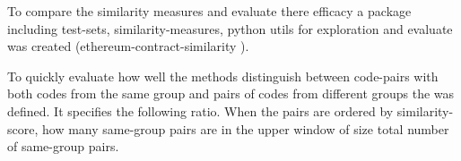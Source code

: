 \documentclass[../main.tex]{subfiles}
\begin{document}
To compare the similarity measures and evaluate there efficacy a package including test-sets,
similarity-measures, python utils for exploration and evaluate was created (ethereum-contract-similarity \cite{ethereum-contract-similarity}).

To quickly evaluate how well the methods distinguish between code-pairs with both codes from the same group and pairs of codes from different groups the  was defined.
It specifies the following ratio.
When the pairs are ordered by similarity-score, how many same-group pairs are in the upper window of size total number of same-group pairs.
\end{document}
